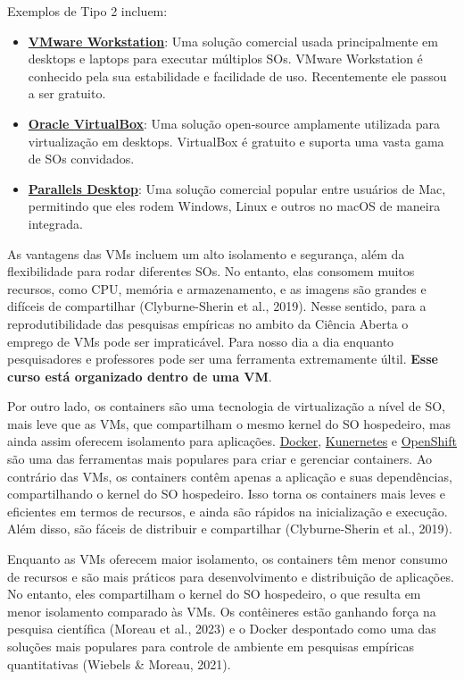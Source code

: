 \documentclass[
  a4paper,
]{book}
\begin{document}
Exemplos de Tipo 2 incluem:

\begin{itemize}
\item
  \href{https://www.vmware.com/products/desktop-hypervisor.html}{\textbf{VMware
  Workstation}}: Uma solução comercial usada principalmente em desktops
  e laptops para executar múltiplos SOs. VMware Workstation é conhecido
  pela sua estabilidade e facilidade de uso. Recentemente ele passou a
  ser gratuito.
\item
  \href{https://www.virtualbox.org/}{\textbf{Oracle VirtualBox}}: Uma
  solução open-source amplamente utilizada para virtualização em
  desktops. VirtualBox é gratuito e suporta uma vasta gama de SOs
  convidados.
\item
  \href{https://www.parallels.com/br/}{\textbf{Parallels Desktop}}: Uma
  solução comercial popular entre usuários de Mac, permitindo que eles
  rodem Windows, Linux e outros no macOS de maneira integrada.
\end{itemize}

As vantagens das VMs incluem um alto isolamento e segurança, além da
flexibilidade para rodar diferentes SOs. No entanto, elas consomem
muitos recursos, como CPU, memória e armazenamento, e as imagens são
grandes e difíceis de compartilhar (Clyburne-Sherin et al., 2019). Nesse
sentido, para a reprodutibilidade das pesquisas empíricas no ambito da
Ciência Aberta o emprego de VMs pode ser impraticável. Para nosso dia a
dia enquanto pesquisadores e professores pode ser uma ferramenta
extremamente últil. \textbf{Esse curso está organizado dentro de uma
VM}.

Por outro lado, os containers são uma tecnologia de virtualização a
nível de SO, mais leve que as VMs, que compartilham o mesmo kernel do SO
hospedeiro, mas ainda assim oferecem isolamento para aplicações.
\href{https://www.docker.com/}{Docker},
\href{https://kubernetes.io/}{Kunernetes} e
\href{https://www.redhat.com/en/technologies/cloud-computing/openshift}{OpenShift}
são uma das ferramentas mais populares para criar e gerenciar
containers. Ao contrário das VMs, os containers contêm apenas a
aplicação e suas dependências, compartilhando o kernel do SO hospedeiro.
Isso torna os containers mais leves e eficientes em termos de recursos,
e ainda são rápidos na inicialização e execução. Além disso, são fáceis
de distribuir e compartilhar (Clyburne-Sherin et al., 2019).

Enquanto as VMs oferecem maior isolamento, os containers têm menor
consumo de recursos e são mais práticos para desenvolvimento e
distribuição de aplicações. No entanto, eles compartilham o kernel do SO
hospedeiro, o que resulta em menor isolamento comparado às VMs. Os
contêineres estão ganhando força na pesquisa científica (Moreau et al.,
2023) e o Docker despontado como uma das soluções mais populares para
controle de ambiente em pesquisas empíricas quantitativas (Wiebels \&
Moreau, 2021).
\end{document}
